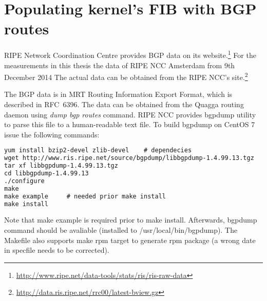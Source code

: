 
\chapter{Populating kernel's FIB with BGP routes}\label{app:bgp}
RIPE Network Coordination Centre provides BGP data on its
website.\footnote{{\url{http://www.ripe.net/data-tools/stats/ris/ris-raw-data}}}
For the measurements in this thesis the data of RIPE NCC Amsterdam from 9th December 2014
The actual data can be obtained from the RIPE NCC's
site.\footnote{{\url{http://data.ris.ripe.net/rrc00/latest-bview.gz}}}

The BGP data is in MRT Routing Information Export Format, which is described in RFC~6396.
The data can be obtained from the Quagga routing daemon
using {\it{dump bgp routes}} command.
RIPE NCC provides bgpdump utility to parse this file to a human-readable text file.
To build bgpdump on CentOS 7 issue the following commands:
\begin{lstlisting}[language=TeX]
yum install bzip2-devel zlib-devel    # dependecies
wget http://www.ris.ripe.net/source/bgpdump/libbgpdump-1.4.99.13.tgz
tar xf libbgpdump-1.4.99.13.tgz
cd libbgpdump-1.4.99.13
./configure
make
make example     # needed prior make install
make install
\end{lstlisting}
Note that make example is required prior to make install.
Afterwards, bgpdump command should be avaliable (installed to /usr/local/bin/bgpdump).
The Makefile also supports make rpm target to generate rpm package (a wrong date in specfile needs to be corrected).

